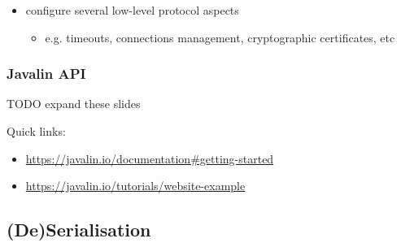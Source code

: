 \documentclass[presentation]{beamer}\mode<presentation>{\usetheme{AMSCesenaPurpleAndGold}}
\begin{document}
\begin{frame}
\begin{itemize}
        \vfill

        \item configure several low-level protocol aspects
        \begin{itemize}
            \item e.g. timeouts, connections management, cryptographic certificates, etc
        \end{itemize}
    \end{itemize}
\end{frame}

\begin{frame}%
    \frametitle{Javalin API}

    TODO expand these slides

    Quick links:
    \begin{itemize}
        \item \url{https://javalin.io/documentation\#getting-started}
        \item \url{https://javalin.io/tutorials/website-example}
    \end{itemize}

\end{frame}

\subsection{(De)Serialisation}
\end{document}

